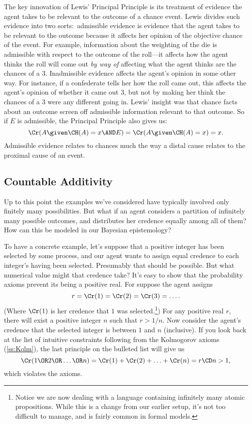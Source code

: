 The key innovation of Lewis' Principal Principle is its treatment of evidence the agent takes to be relevant to the outcome of a chance event. Lewis divides such evidence into two sorts:\ admissible evidence is evidence that the agent takes to be relevant to the outcome because it affects her opinion of the objective chance of the event. For example, information about the weighting of the die is admissible with respect to the outcome of the roll---it affects how the agent thinks the roll will come out \emph{by way of} affecting what the agent thinks are the chances of a $3$. Inadmissible evidence affects the agent's opinion in some other way. For instance, if a confederate tells her how the roll came out, this affects the agent's opinion of whether it came out $3$, but not by making her think the chances of a $3$ were any different going in. Lewis' insight was that chance facts about an outcome screen off admissible information relevant to that outcome. So if $E$ is admissible, the Principal Principle also gives us: 
\begin{equation}
\Cr(A \given \CH(A)=x \AND E) = \Cr(A \given \CH(A)=x)=x.
\end{equation}
Admissible evidence relates to chances much the way a distal cause relates to the proximal cause of an event.

\subsection{Countable Additivity} \label{ss:infinite}
Up to this point the examples we've considered have typically involved only finitely many possibilities. But what if an agent considers a partition of infinitely many possible outcomes, and distributes her credence equally among all of them? How can this be modeled in our Bayesian epistemology?

To have a concrete example, let's suppose that a positive integer has been selected by some process, and our agent wants to assign equal credence to each integer's having been selected. Presumably that should be possible. But what numerical value might that credence take? It's easy to show that the probability axioms prevent its being a positive real. For suppose the agent assigns
\begin{equation}
r=\Cr(1)=\Cr(2)=\Cr(3)=\ldots.
\end{equation}
(Where $\Cr(1)$ is her credence that $1$ was selected.\footnote
{Notice we are now dealing with a language containing infinitely many atomic propositions. While this is a change from our earlier setup, it's not too difficult to manage, and is fairly common in formal models.}) For any positive real $r$, there will exist a positive integer $n$ such that $r>1/n$. Now consider the agent's credence that the selected integer is between $1$ and $n$ (inclusive). If you look back at the list of intuitive constraints following from the Kolmogorov axioms (\autoref{ss:Kolm}), the last principle on the bulleted list will give us
\begin{equation} \label{eq:addem}
\Cr(1 \OR 2 \OR \ldots \OR n)=\Cr(1) + \Cr(2) + \ldots + \Cr(n) = r \CD n > 1,
\end{equation}
which violates the axioms.

